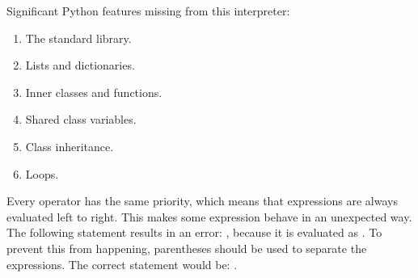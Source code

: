 Significant Python features missing from this interpreter:
\begin{enumerate}
    \item The standard library.
    \item Lists and dictionaries.
    \item Inner classes and functions.
    \item Shared class variables.
    \item Class inheritance.
    \item Loops.
\end{enumerate}
Every operator has the same priority, which means that expressions are always evaluated left to right. This makes some expression behave in an unexpected way. The following statement results in an error: , because it is evaluated as . To prevent this from happening, parentheses should be used to separate the expressions. The correct statement would be: .

